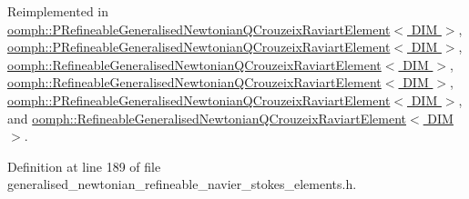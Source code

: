 Reimplemented in \hyperlink{classoomph_1_1PRefineableGeneralisedNewtonianQCrouzeixRaviartElement_a5c0f444f1be1636d9cb67c754bbf76ac}{oomph\+::\+P\+Refineable\+Generalised\+Newtonian\+Q\+Crouzeix\+Raviart\+Element$<$ D\+I\+M $>$}, \hyperlink{classoomph_1_1PRefineableGeneralisedNewtonianQCrouzeixRaviartElement_a081745337b1a25f560af7199dfa75ce3}{oomph\+::\+P\+Refineable\+Generalised\+Newtonian\+Q\+Crouzeix\+Raviart\+Element$<$ D\+I\+M $>$}, \hyperlink{classoomph_1_1RefineableGeneralisedNewtonianQCrouzeixRaviartElement_ab6ba5ac30da8e91baa12c59d7805f6e5}{oomph\+::\+Refineable\+Generalised\+Newtonian\+Q\+Crouzeix\+Raviart\+Element$<$ D\+I\+M $>$}, \hyperlink{classoomph_1_1RefineableGeneralisedNewtonianQCrouzeixRaviartElement_a4e9f97f8423604d44da0843a46bb797d}{oomph\+::\+Refineable\+Generalised\+Newtonian\+Q\+Crouzeix\+Raviart\+Element$<$ D\+I\+M $>$}, \hyperlink{classoomph_1_1PRefineableGeneralisedNewtonianQCrouzeixRaviartElement_a4036689a0d7a43ab7f3bbb18204ec404}{oomph\+::\+P\+Refineable\+Generalised\+Newtonian\+Q\+Crouzeix\+Raviart\+Element$<$ D\+I\+M $>$}, and \hyperlink{classoomph_1_1RefineableGeneralisedNewtonianQCrouzeixRaviartElement_ab98f5825068568b99dd2f744a3e2afb3}{oomph\+::\+Refineable\+Generalised\+Newtonian\+Q\+Crouzeix\+Raviart\+Element$<$ D\+I\+M $>$}.



Definition at line 189 of file generalised\+\_\+newtonian\+\_\+refineable\+\_\+navier\+\_\+stokes\+\_\+elements.\+h.



